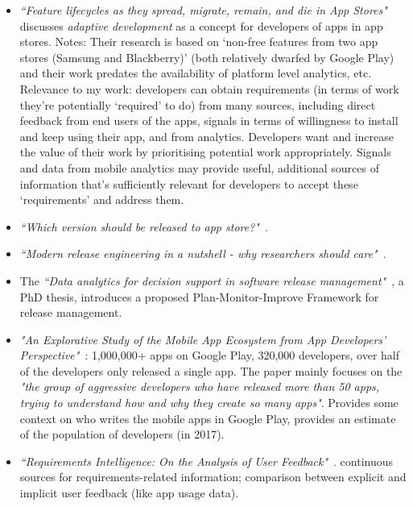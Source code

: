 \begin{itemize}
    \item \emph{``Feature lifecycles as they spread, migrate, remain, and die in App Stores"}~\cite{sarro2015_feature_lifecycles_in_appstores} discusses \emph{adaptive development} as a concept for developers of apps in app stores. Notes: Their research is based on `non-free features from two app stores (Samsung and Blackberry)' (both relatively dwarfed by Google Play) and their work predates the availability of platform level analytics, etc. Relevance to my work: developers can obtain requirements (in terms of work they're potentially `required' to do) from many sources, including direct feedback from end users of the apps, signals in terms of willingness to install and keep using their app, and from analytics. Developers want and increase the value of their work by prioritising potential work appropriately. Signals and data from mobile analytics may provide useful, additional sources of information that's sufficiently relevant for developers to accept these `requirements' and address them.
    
    \item \emph{``Which version should be released to app store?"}~\cite{nayebi2017version}.
    
    \item \emph{``Modern release engineering in a nutshell - why researchers should care"}~\cite{adams2016modern}.
    
    \item The \emph{``Data analytics for decision support in software release management"}~\cite{didar2018data_analytics_phd_thesis}, a PhD thesis, introduces a proposed Plan-Monitor-Improve Framework for release management.
    
    \item \emph{"An Explorative Study of the Mobile App Ecosystem from App Developers' Perspective"}~\cite{wang2017_exploratory_study_of_the_mobile_app_ecosystem}: 1,000,000+ apps on Google Play, 320,000 developers, over half of the developers only released a single app. The paper mainly focuses on the \emph{"the group of aggressive developers who have released more than 50 apps, trying to understand how and why they create so many apps"}. Provides some context on who writes the mobile apps in Google Play, provides an estimate of the population of developers (in 2017).
    
    \item \emph{``Requirements Intelligence: On the Analysis of User Feedback"}~\cite{stanik2020requirements_intelligence_on_the_analysis_of_user_feedback}. continuous sources for requirements-related information; comparison between explicit and implicit user feedback (like app usage data).
    

\end{itemize}
